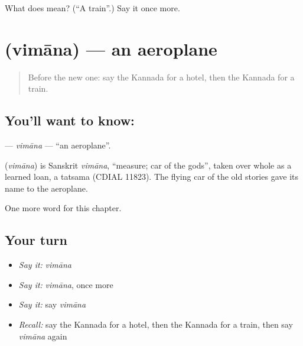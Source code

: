 \begin{tcolorbox}[breakable,colback=teal!4,colframe=teal!35!black,title={Before you move on}]
What does  mean? (\textquotedblleft{}A train\textquotedblright{}.) Say it once more.
\end{tcolorbox}
\section[\texorpdfstring{\kn{ವಿಮಾನ} (vimāna)}{ವಿಮಾನ (vimāna)}]{ (vimāna) — an aeroplane}

\label{lesson:KA-C111-vimana}



\begin{quote}
Before the new one: say the Kannada for a hotel, then the Kannada for a train.
\end{quote}

\subsection*{You'll want to know: }
\textbf{} — \emph{vimāna} — \textquotedblleft{}an aeroplane\textquotedblright{}.

\begin{cousinweb}
\textbf{} (\emph{vimāna}) is Sanskrit \emph{vimāna}, \textquotedblleft{}measure; car of the gods\textquotedblright{}, taken over whole as a learned loan, a tatsama (CDIAL 11823). The flying car of the old stories gave its name to the aeroplane.
\end{cousinweb}

\begin{grammarlens}[title={What you've built}]
One more word for this chapter.
\end{grammarlens}

\subsection*{Your turn}
\begin{itemize}
\raggedright
  \item \emph{Say it:} \emph{vimāna}
  \item \emph{Say it:} \emph{vimāna}, once more
  \item \emph{Say it:} say \emph{vimāna}
  \item \emph{Recall:} say the Kannada for a hotel, then the Kannada for a train, then say \emph{vimāna} again
\end{itemize}

